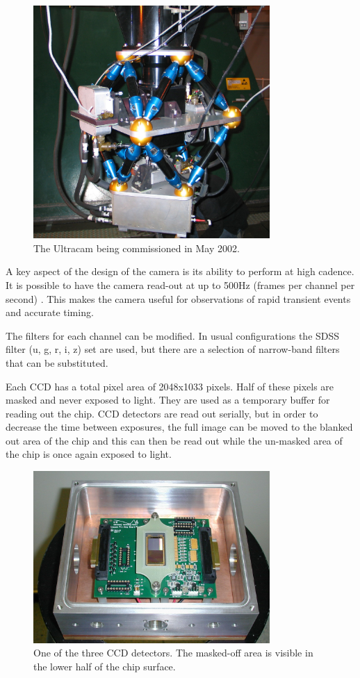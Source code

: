 \documentclass[a4paper,10pt]{article}
\begin{document}
\begin{figure}[!h]
\centering
\includegraphics[width=90mm]{images/IMG_0121_scaled.JPG}
\caption{The Ultracam being commissioned in May 2002.}
\label{fig1}
\end{figure}


A key aspect of the design of the camera is its ability to perform at high cadence. It is possible to have the camera read-out at up to 500Hz (frames per channel per second) \cite{dhillon07}. This makes the camera useful for observations of rapid transient events and accurate timing. 

The filters for each channel can be modified. In usual configurations the SDSS filter (u, g, r, i, z) set are used, but there are a selection of narrow-band filters that can be substituted.  

Each CCD has a total pixel area of 2048x1033 pixels. Half of these pixels are masked and never exposed to light. They are used as a temporary buffer for reading out the chip. CCD detectors are read out serially, but in order to decrease the time between exposures, the full image can be moved to the blanked out area of the chip and this can then be read out while the un-masked area of the chip is once again exposed to light. 

\begin{figure}[!h]
\centering
\includegraphics[width=90mm]{images/ccd.png}
\caption{One of the three CCD detectors. The masked-off area is visible in the lower half of the chip surface.}
\label{fig2}
\end{figure}
\end{document}

